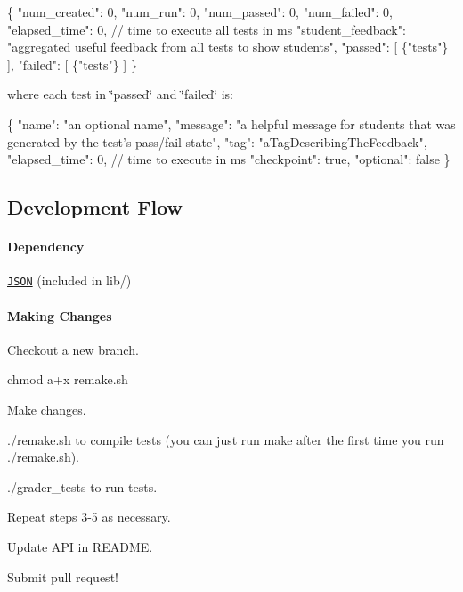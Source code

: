 \begin{DoxyCode}
\{
  "num\_created": 0,
  "num\_run": 0,
  "num\_passed": 0,
  "num\_failed": 0,
  "elapsed\_time": 0, // time to execute all tests in ms
  "student\_feedback": "aggregated useful feedback from all tests to show students",
  "passed": [ \{"tests"\} ],
  "failed": [ \{"tests"\} ]
\}
\end{DoxyCode}


where each {\ttfamily test} in {\ttfamily \char`\"{}passed\char`\"{}} and {\ttfamily \char`\"{}failed\char`\"{}} is\+:


\begin{DoxyCode}
\{
  "name": "an optional name",
  "message": "a helpful message for students that was generated by the test's pass/fail state",
  "tag": "aTagDescribingTheFeedback",
  "elapsed\_time": 0, // time to execute in ms
  "checkpoint": true,
  "optional": false
\}
\end{DoxyCode}


\subsection*{Development Flow}

\paragraph*{Dependency}

\href{https://github.com/nlohmann/json}{\tt J\+S\+ON} (included in lib/)

\paragraph*{Making Changes}


\begin{DoxyEnumerate}
\item Checkout a new branch.
\item {\ttfamily chmod a+x remake.\+sh}
\item Make changes.
\item {\ttfamily ./remake.sh} to compile tests (you can just run {\ttfamily make} after the first time you run {\ttfamily ./remake.sh}).
\item {\ttfamily ./grader\+\_\+tests} to run tests.
\item Repeat steps 3-\/5 as necessary.
\item Update A\+PI in R\+E\+A\+D\+ME.
\item Submit pull request! 
\end{DoxyEnumerate}